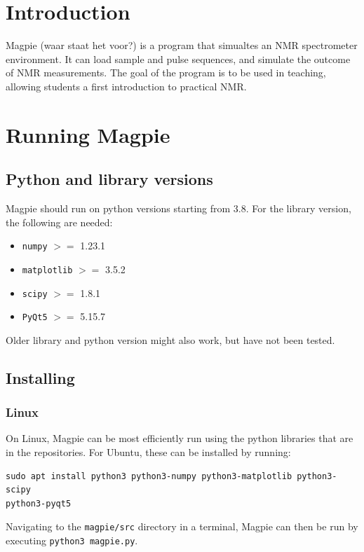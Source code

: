 \documentclass[11pt,a4paper]{article}
\renewcommand\cfttoctitlefont{\color{black!70}\Huge\fontfamily{SourceSansPro-LF}\bfseries}
\begin{document}


\thispagestyle{empty}
\newpage
\mbox{}


\renewcommand\cfttoctitlefont{\color{black}\Huge\fontfamily{SourceSansPro-LF}\bfseries}
\setcounter{tocdepth}{2}
\tableofcontents %

\renewcommand\cfttoctitlefont{\color{black!70}\Huge\fontfamily{SourceSansPro-LF}\bfseries}


\section{Introduction}
Magpie (waar staat het voor?) is a program that simualtes an NMR spectrometer environment. It can load sample and pulse sequences, and simulate the outcome of NMR measurements. The goal of the program is to be used in teaching, allowing students a first introduction to practical NMR.


\section{Running Magpie}
\subsection{Python and library versions}
Magpie should run on python
versions starting from 3.8.
For the library version, the following are needed:
\begin{itemize}
  \item  \texttt{numpy} $>=$ 1.23.1
  \item  \texttt{matplotlib} $>=$ 3.5.2
  \item  \texttt{scipy} $>=$ 1.8.1
  \item \texttt{PyQt5} $>=$ 5.15.7
\end{itemize}
Older library and python version might also work, but have not been tested.

\subsection{Installing}
\subsubsection{Linux}
On Linux, Magpie can be most efficiently run using the python libraries that are in the
repositories. For Ubuntu, these can be installed by running:
\begin{verbatim}
sudo apt install python3 python3-numpy python3-matplotlib python3-scipy
python3-pyqt5
\end{verbatim}
Navigating to the \texttt{magpie/src} directory in a terminal, Magpie can then be run
by executing \texttt{python3 magpie.py}.
\end{document}
